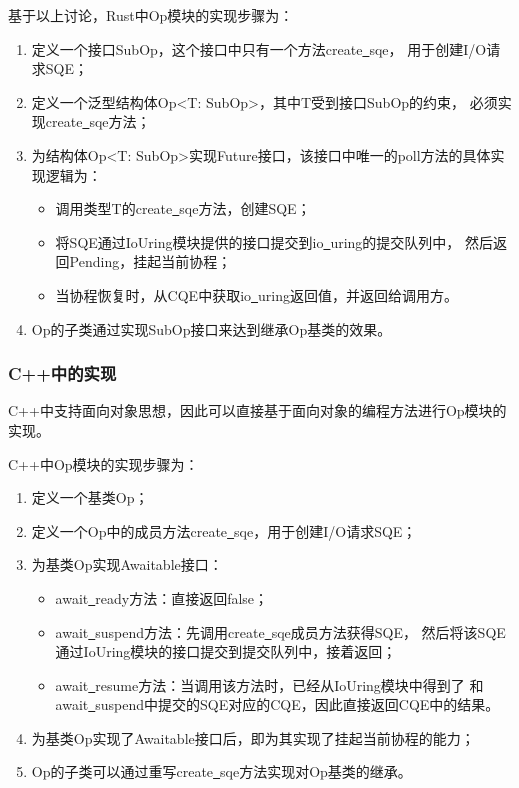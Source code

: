 \documentclass[supercite]{HustGraduPaper}
\theoremstyle{definition}
\begin{document}
基于以上讨论，Rust中Op模块的实现步骤为：

\begin{enumerate}
  \item 定义一个接口SubOp，这个接口中只有一个方法create\underline{~}sqe，
    用于创建I/O请求SQE；
  \item 定义一个泛型结构体Op<T: SubOp>，其中T受到接口SubOp的约束，
    必须实现create\underline{~}sqe方法；
  \item 为结构体Op<T: SubOp>实现Future接口，该接口中唯一的poll方法的具体实现逻辑为：
    \begin{itemize}
      \item 调用类型T的create\underline{~}sqe方法，创建SQE；
      \item 将SQE通过IoUring模块提供的接口提交到io\underline{~}uring的提交队列中，
        然后返回Pending，挂起当前协程；
      \item 当协程恢复时，从CQE中获取io\underline{~}uring返回值，并返回给调用方。
    \end{itemize}
  \item Op的子类通过实现SubOp接口来达到继承Op基类的效果。
\end{enumerate}

\subsubsection{C++中的实现}

C++中支持面向对象思想，因此可以直接基于面向对象的编程方法进行Op模块的实现。\par

C++中Op模块的实现步骤为：

\begin{enumerate}
  \item 定义一个基类Op；
  \item 定义一个Op中的成员方法create\underline{~}sqe，用于创建I/O请求SQE；
  \item 为基类Op实现Awaitable接口：
    \begin{itemize}
      \item await\underline{~}ready方法：直接返回false；
      \item await\underline{~}suspend方法：先调用create\underline{~}sqe成员方法获得SQE，
        然后将该SQE通过IoUring模块的接口提交到提交队列中，接着返回；
      \item await\underline{~}resume方法：当调用该方法时，已经从IoUring模块中得到了
        和await\underline{~}suspend中提交的SQE对应的CQE，因此直接返回CQE中的结果。
    \end{itemize}
  \item 为基类Op实现了Awaitable接口后，即为其实现了挂起当前协程的能力；
  \item Op的子类可以通过重写create\underline{~}sqe方法实现对Op基类的继承。
\end{enumerate}
\end{document}
